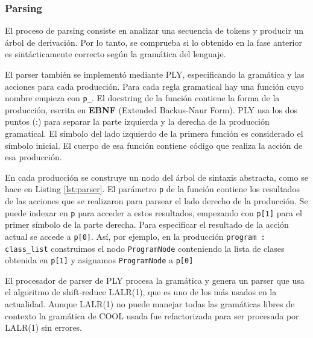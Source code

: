 \documentclass[11pt]{scrartcl} %
\begin{document}
\subsubsection{Parsing}

El proceso de parsing consiste en analizar una secuencia de tokens y producir un árbol de derivación. Por lo tanto, se comprueba si lo obtenido en la fase anterior es sintácticamente correcto según la gramática del lenguaje.

El parser también se implementó mediante PLY, especificando la gramática y las acciones para cada producción. Para cada regla gramatical hay una función cuyo nombre empieza con \texttt{p\_}. El docstring de la función contiene la forma de la producción, escrita en \textbf{EBNF} (Extended Backus-Naur Form). PLY usa los dos puntos (:) para separar la parte izquierda y la derecha de la producción gramatical. El símbolo del lado izquierdo de la primera función es considerado el símbolo inicial. El cuerpo de esa función contiene código que realiza la acción de esa producción.

En cada producción se construye un nodo del árbol de sintaxis abstracta, como se hace en Listing \ref{lst:parser}. El parámetro \texttt{p} de la función contiene los resultados de las acciones que se realizaron para parsear el lado derecho de la producción. Se puede indexar en \texttt{p} para acceder a estos resultados, empezando con \texttt{p[1]} para el primer símbolo de la parte derecha. Para especificar el resultado de la acción actual se accede a \texttt{p[0]}. Así, por ejemplo, en la producción \texttt{program : class\_list} construimos el nodo \texttt{ProgramNode} conteniendo la lista de clases obtenida en \texttt{p[1]} y asignamos \texttt{ProgramNode} a \texttt{p[0]}



El procesador de parser de PLY procesa la gramática y genera un parser que usa el algoritmo de shift-reduce LALR(1), que es uno de los más usados en la actualidad. Aunque LALR(1) no puede manejar todas las gramáticas libres de contexto la gramática de COOL usada fue refactorizada para ser procesada por LALR(1) sin errores. 
\end{document}
